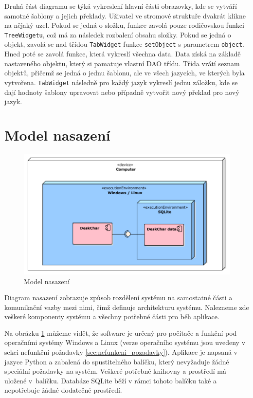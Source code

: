\documentclass[thesis=B,czech]{resources/FITthesis}[2012/06/26]
\begin{document}
Druhá část diagramu se týká vykreslení hlavní části obrazovky, kde se vytváří samotné šablony a jejich překlady. Uživatel ve stromové struktuře dvakrát klikne na nějaký uzel. Pokud se jedná o složku, funkce zavolá pouze rodičovskou funkci \texttt{TreeWidgetu}, což má za následek rozbalení obsahu složky. Pokud se jedná o objekt, zavolá se nad třídou \texttt{TabWidget} funkce \texttt{setObject} s parametrem \texttt{object}. Hned poté se zavolá funkce, která vykreslí všechna data. Data získá na základě nastaveného objektu, který si pamatuje vlastní DAO třídu. Třída vrátí seznam objektů, přičemž se jedná o jednu šablonu, ale ve všech jazycích, ve kterých byla vytvořena. \texttt{TabWidget} následně pro každý jazyk vykreslí jednu záložku, kde se dají hodnoty šablony upravovat nebo případně vytvořit nový překlad pro nový jazyk.
	
	\section{Model nasazení}
	\begin{figure}\centering
	\includegraphics[width=1\textwidth]{images/model_nasazeni}
	\caption[Model nasazení]{Model nasazení}\label{fig:model_nasazeni}
	\end{figure}
Diagram nasazení zobrazuje způsob rozdělení systému na samostatné části a komunikační vazby mezi nimi, čímž definuje architekturu systému. Nalezneme zde veškeré komponenty systému a všechny potřebné části pro běh aplikace.\par

Na obrázku \ref{fig:model_nasazeni} můžeme vidět, že software je určený pro počítače a funkční pod operačními systémy Windows a Linux (verze operačního systému jsou uvedeny v sekci nefunkční požadavky \ref{sec:nefunkcni_pozadavky}). Aplikace je napsaná v jazyce Python a zabalená do spustitelného balíčku, který nevyžaduje žádné speciální požadavky na systém. Veškeré potřebné knihovny a prostředí má uložené v~balíčku. Databáze SQLite běží v rámci tohoto balíčku také a nepotřebuje žádné dodatečné prostředí.
\end{document}
